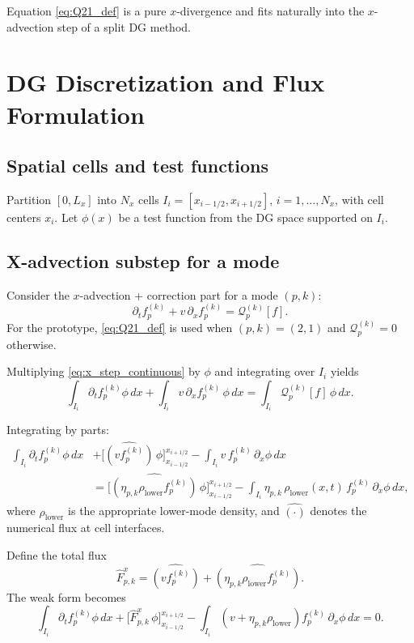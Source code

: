 \documentclass[11pt]{article}
\begin{document}
Equation \eqref{eq:Q21_def} is a pure $x$-divergence and fits naturally into
the $x$-advection step of a split DG method.

\section{DG Discretization and Flux Formulation}

\subsection{Spatial cells and test functions}

Partition $[0,L_x]$ into $N_x$ cells
$ I_i = [x_{i-1/2}, x_{i+1/2}]$, $i=1,\dots,N_x$, with cell centers
$x_i$. Let $\phi(x)$ be a test function from the DG space supported on
$ I_i$.

\subsection{X-advection substep for a mode}

Consider the $x$-advection + correction part for a mode $(p,k)$:
\begin{equation}
  \partial_t f_p^{(k)} + v\,\partial_x f_p^{(k)}
  =
  \mathcal{Q}_p^{(k)}[f].
  \label{eq:x_step_continuous}
\end{equation}
For the prototype, \eqref{eq:Q21_def} is used when $(p,k)=(2,1)$ and
$\mathcal{Q}_p^{(k)}=0$ otherwise.

Multiplying \eqref{eq:x_step_continuous} by $\phi$ and integrating over
$I_i$ yields
\[
  \int_{I_i} \partial_t f_p^{(k)} \phi\,dx
  +\int_{I_i} v\,\partial_x f_p^{(k)}\,\phi\,dx
  =
  \int_{I_i} \mathcal{Q}_p^{(k)}[f]\,\phi\,dx.
\]

Integrating by parts:
\begin{align*}
  \int_{I_i} \partial_t f_p^{(k)} \phi\,dx
  &+ \Big[ \widehat{(v f_p^{(k)})} \,\phi\Big]_{x_{i-1/2}}^{x_{i+1/2}}
  - \int_{I_i} v\,f_p^{(k)}\,\partial_x\phi\,dx \\
  &= \Big[ \widehat{(\eta_{p,k}\rho_{\text{lower}} f_p^{(k)})}\,\phi\Big]_{x_{i-1/2}}^{x_{i+1/2}}
  - \int_{I_i}\eta_{p,k}\,\rho_{\text{lower}}(x,t)\,f_p^{(k)}\,\partial_x\phi\,dx,
\end{align*}
where $\rho_{\text{lower}}$ is the appropriate lower-mode density, and 
$\widehat{(\cdot)}$ denotes the numerical flux at cell interfaces.

Define the total flux
\[
  \widehat{F}^{x}_{p,k}
  =
  \widehat{(v f_p^{(k)})}
  +
  \widehat{(\eta_{p,k}\rho_{\text{lower}} f_p^{(k)})}.
\]
The weak form becomes
\begin{equation}
  \int_{I_i} \partial_t f_p^{(k)} \phi\,dx
  +
  \Big[ \widehat{F}^{x}_{p,k}\,\phi\Big]_{x_{i-1/2}}^{x_{i+1/2}}
  -
  \int_{I_i} (v+\eta_{p,k}\rho_{\text{lower}}) f_p^{(k)}\,\partial_x\phi\,dx
  = 0.
  \label{eq:DG_weak_form}
\end{equation}
\end{document}
